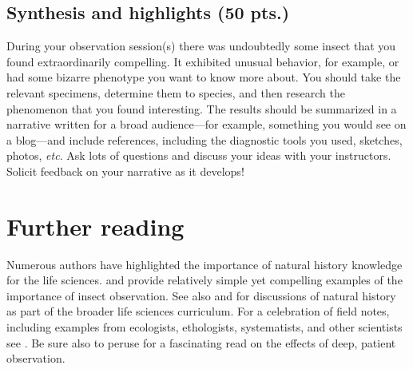\documentclass[letterpaper, 11pt]{article}
\begin{document}
\subsection*{Synthesis and highlights (50 pts.)}
During your observation session(s) there was undoubtedly some insect that you found extraordinarily compelling. It exhibited unusual behavior, for example, or had some bizarre phenotype you want to know more about. You should take the relevant specimens, determine them to species, and then research the phenomenon that you found interesting. The results should be summarized in a narrative written for a broad audience---for example, something you would see on a blog---and include references, including the diagnostic tools you used, sketches, photos, \textit{etc}. Ask lots of questions and discuss your ideas with your instructors. Solicit feedback on your narrative as it develops!

\section*{Further reading}
Numerous authors have highlighted the importance of natural history knowledge for the life sciences. \cite{agrawal2014} and \cite{wilcoveeisner2000} provide relatively simple yet compelling examples of the importance of insect observation. See also \cite{Schmidly449} and \cite{Barrows13042016} for discussions of natural history as part of the broader life sciences curriculum. For a celebration of field notes, including examples from ecologists, ethologists, systematists, and other scientists see \cite{canfield2011field}. Be sure also to peruse \cite{roberts2013} for a fascinating read on the effects of deep, patient observation.



\end{document}
